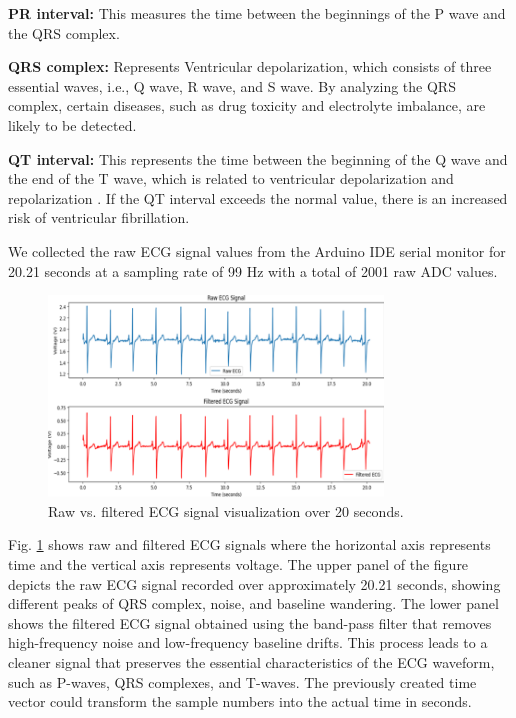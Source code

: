 \documentclass[conference]{IEEEtran}
\begin{document}
\textbf{PR interval:} This measures the time between the beginnings of the P wave and the QRS complex.

\textbf{QRS complex:} Represents Ventricular depolarization, which consists of three essential waves, i.e., Q wave, R wave, and S wave. By analyzing the QRS complex, certain diseases, such as drug toxicity and electrolyte imbalance, are likely to be detected.

\textbf{QT interval:} This represents the time between the beginning of the Q wave and the end of the T wave, which is related to ventricular depolarization and repolarization \cite{shaown2019iot}. If the QT interval exceeds the normal value, there is an increased risk of ventricular fibrillation.

We collected the raw ECG signal values from the Arduino IDE serial monitor for 20.21 seconds at a sampling rate of 99 Hz with a total of 2001 raw ADC values.

\begin{figure}[htbp]
\centerline{\includegraphics[width=3.5in]{14-Raw Vs. Filtered ECG.png}}
\caption{Raw vs. filtered ECG signal visualization over 20 seconds.}
\label{fig-14:Raw-Vs-Filtered-ECG}
\end{figure}

Fig. \ref{fig-14:Raw-Vs-Filtered-ECG} shows raw and filtered ECG signals where the horizontal axis represents time and the vertical axis represents voltage. The upper panel of the figure depicts the raw ECG signal recorded over approximately 20.21 seconds, showing different peaks of QRS complex, noise, and baseline wandering. The lower panel shows the filtered ECG signal obtained using the band-pass filter that removes high-frequency noise and low-frequency baseline drifts. This process leads to a cleaner signal that preserves the essential characteristics of the ECG waveform, such as P-waves, QRS complexes, and T-waves. The previously created time vector could transform the sample numbers into the actual time in seconds. 
\end{document}
